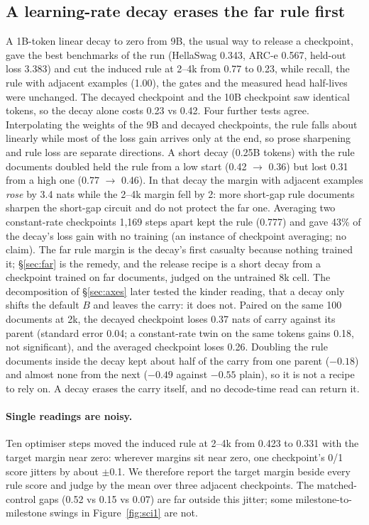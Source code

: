 \documentclass[11pt]{article}
\begin{document}
\subsection{A learning-rate decay erases the far rule first}
\label{sec:decayrule}
A 1B-token linear decay to zero from 9B, the usual way to release a checkpoint, gave the best benchmarks of the run (HellaSwag 0.343, ARC-e 0.567, held-out loss 3.383) and cut the induced rule at 2--4k from 0.77 to 0.23, while recall, the rule with adjacent examples (1.00), the gates and the measured head half-lives were unchanged. The decayed checkpoint and the 10B checkpoint saw identical tokens, so the decay alone costs 0.23 vs 0.42. Four further tests agree. Interpolating the weights of the 9B and decayed checkpoints, the rule falls about linearly while most of the loss gain arrives only at the end, so prose sharpening and rule loss are separate directions. A short decay (0.25B tokens) with the rule documents doubled held the rule from a low start (0.42 $\to$ 0.36) but lost 0.31 from a high one (0.77 $\to$ 0.46). In that decay the margin with adjacent examples \emph{rose} by 3.4 nats while the 2--4k margin fell by 2: more short-gap rule documents sharpen the short-gap circuit and do not protect the far one. Averaging two constant-rate checkpoints 1,169 steps apart kept the rule (0.777) and gave 43\% of the decay's loss gain with no training (an instance of checkpoint averaging; no claim). The far rule margin is the decay's first casualty because nothing trained it; \S\ref{sec:far} is the remedy, and the release recipe is a short decay from a checkpoint trained on far documents, judged on the untrained 8k cell. The decomposition of \S\ref{sec:axes} later tested the kinder reading, that a decay only shifts the default $B$ and leaves the carry: it does not. Paired on the same 100 documents at 2k, the decayed checkpoint loses 0.37 nats of carry against its parent (standard error 0.04; a constant-rate twin on the same tokens gains 0.18, not significant), and the averaged checkpoint loses 0.26. Doubling the rule documents inside the decay kept about half of the carry from one parent ($-0.18$) and almost none from the next ($-0.49$ against $-0.55$ plain), so it is not a recipe to rely on. A decay erases the carry itself, and no decode-time read can return it.

\paragraph{Single readings are noisy.} Ten optimiser steps moved the induced rule at 2--4k from 0.423 to 0.331 with the target margin near zero: wherever margins sit near zero, one checkpoint's 0/1 score jitters by about $\pm$0.1. We therefore report the target margin beside every rule score and judge by the mean over three adjacent checkpoints. The matched-control gaps (0.52 vs 0.15 vs 0.07) are far outside this jitter; some milestone-to-milestone swings in Figure~\ref{fig:sci1} are not.
\end{document}
